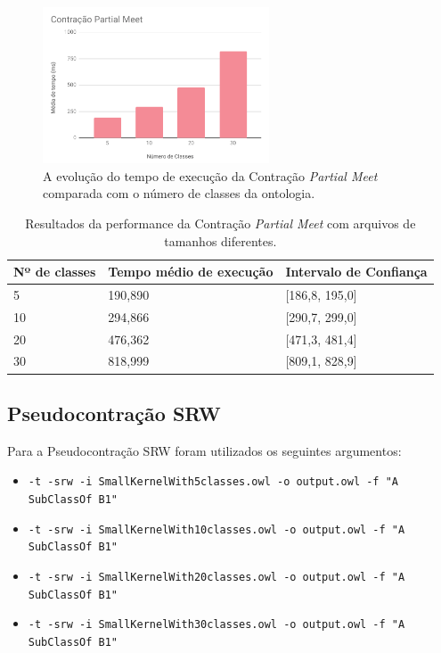 \begin{figure}[H]
	\centering
	\includegraphics[width=0.6\textwidth]{Capitulos/Testes/graficocpm.png}
	\caption{A evolução do tempo de execução da Contração \textit{Partial Meet} comparada com o número de classes da ontologia.}
	\label{img:graficocpm}
\end{figure}

\begin{table}[H]
	\centering
	\begin{tabular}{|l|l|l|}
		\hline
		\textbf{Nº de classes}  & \textbf{Tempo médio de execução} & \textbf{Intervalo de Confiança} \\ \hline
		5                                                  & 190,890                          & {[}186,8, 195,0{]}              \\ \hline
		10                                                 & 294,866                          & {[}290,7, 299,0{]}              \\ \hline
		20                                                 & 476,362                          & {[}471,3, 481,4{]}              \\ \hline
		30                                                 & 818,999                          & {[}809,1, 828,9{]}              \\ \hline
	\end{tabular}
	\caption{Resultados da performance da Contração \textit{Partial Meet} com arquivos de tamanhos diferentes.}
	\label{tab:cpm}	
\end{table}

\subsection{Pseudocontração SRW}

Para a Pseudocontração SRW foram utilizados os seguintes argumentos:

\begin{itemize}
	\item \texttt{-t -srw -i SmallKernelWith5classes.owl -o output.owl -f "A SubClassOf B1"}
	\item \texttt{-t -srw -i SmallKernelWith10classes.owl -o output.owl -f "A SubClassOf B1"}
	\item \texttt{-t -srw -i SmallKernelWith20classes.owl -o output.owl -f "A SubClassOf B1"}
	\item \texttt{-t -srw -i SmallKernelWith30classes.owl -o output.owl -f "A SubClassOf B1"}
\end{itemize}

